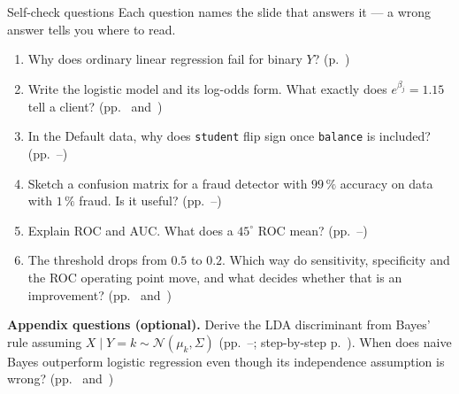 \documentclass[aspectratio=169,11pt]{beamer}
\begin{document}
\begin{frame}{Self-check questions}
  Each question names the slide that answers it --- a wrong answer tells you
  where to read.
  \small
  \begin{enumerate}
    \item Why does ordinary linear regression fail for binary $Y$?
          (p.~\pageref{frm:whynotols})
    \item Write the logistic model and its log-odds form. What exactly does
          $e^{\beta_j}=1.15$ tell a client? (pp.~\pageref{frm:logmodel} and~\pageref{frm:coefint})
    \item In the Default data, why does \texttt{student} flip sign
          once \texttt{balance} is included? (pp.~\pageref{frm:student}--\pageref{frm:studentviz})
    \item Sketch a confusion matrix for a fraud detector with $99\,\%$
          accuracy on data with $1\,\%$ fraud. Is it useful?
          (pp.~\pageref{frm:accuracy}--\pageref{frm:confmat})
    \item Explain ROC and AUC. What does a $45^\circ$ ROC mean?
          (pp.~\pageref{frm:roc}--\pageref{frm:auc})
    \item The threshold drops from $0.5$ to $0.2$. Which way do
          sensitivity, specificity and the ROC operating point move, and
          what decides whether that is an improvement? (pp.~\pageref{frm:confmat} and~\pageref{frm:threshold})
  \end{enumerate}
  \vspace{1mm}
  {\footnotesize \textbf{Appendix questions (optional).}
  Derive the LDA discriminant from Bayes' rule assuming
  $X\mid Y=k\sim\mathcal{N}(\mu_k,\Sigma)$ (pp.~\pageref{frm:ldaassume}--\pageref{frm:ldadisc}; step-by-step p.~\pageref{frm:ee42}).
  When does naive Bayes outperform logistic regression even though its
  independence assumption is wrong? (pp.~\pageref{frm:nb} and~\pageref{frm:compare})}
\end{frame}
\end{document}
